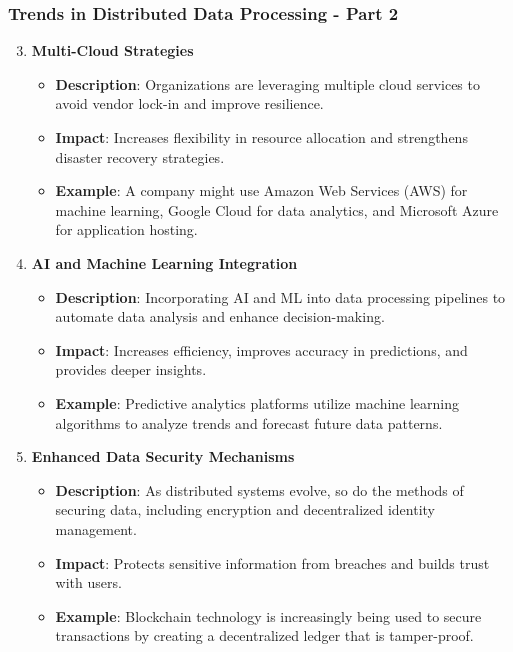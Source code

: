 \documentclass[aspectratio=169]{beamer}
\begin{document}
\begin{frame}[fragile]
  \frametitle{Trends in Distributed Data Processing - Part 2}
  \begin{enumerate}
    \setcounter{enumi}{2}
    \item \textbf{Multi-Cloud Strategies}
    \begin{itemize}
      \item \textbf{Description}: Organizations are leveraging multiple cloud services to avoid vendor lock-in and improve resilience.
      \item \textbf{Impact}: Increases flexibility in resource allocation and strengthens disaster recovery strategies.
      \item \textbf{Example}: A company might use Amazon Web Services (AWS) for machine learning, Google Cloud for data analytics, and Microsoft Azure for application hosting.
    \end{itemize}

    \item \textbf{AI and Machine Learning Integration}
    \begin{itemize}
      \item \textbf{Description}: Incorporating AI and ML into data processing pipelines to automate data analysis and enhance decision-making.
      \item \textbf{Impact}: Increases efficiency, improves accuracy in predictions, and provides deeper insights.
      \item \textbf{Example}: Predictive analytics platforms utilize machine learning algorithms to analyze trends and forecast future data patterns.
    \end{itemize}

    \item \textbf{Enhanced Data Security Mechanisms}
    \begin{itemize}
      \item \textbf{Description}: As distributed systems evolve, so do the methods of securing data, including encryption and decentralized identity management.
      \item \textbf{Impact}: Protects sensitive information from breaches and builds trust with users.
      \item \textbf{Example}: Blockchain technology is increasingly being used to secure transactions by creating a decentralized ledger that is tamper-proof.
    \end{itemize}
  \end{enumerate}
\end{frame}
\end{document}
